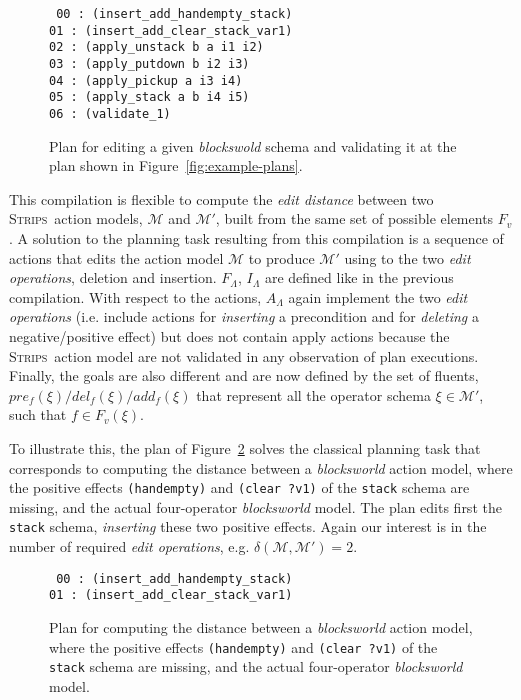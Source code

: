\documentclass[3p,times]{elsarticle}
\newcommand{\strips}{\textsc{Strips}}     %
\begin{document}
\begin{figure}[hbt!]
{\tt\small
00 : (insert\_add\_handempty\_stack)\\
01 : (insert\_add\_clear\_stack\_var1)\\
02 : (apply\_unstack b a i1 i2)\\
03 : (apply\_putdown b i2 i3)\\
04 : (apply\_pickup a i3 i4)\\
05 : (apply\_stack a b i4 i5)\\
06 : (validate\_1)
}
 \caption{\small Plan for editing a given {\em blockswold} schema and validating it at the plan shown in Figure~\ref{fig:example-plans}.}
\label{fig:plan-pdistance}
\end{figure}

This compilation is flexible to compute the {\em edit distance} between two \strips\ action models, $\mathcal{M}$ and $\mathcal{M}'$, built from the same set of possible elements $F_v$. A solution to the planning task resulting from this compilation is a sequence of actions that edits the action model $\mathcal{M}$ to produce $\mathcal{M}'$ using to the two {\em edit operations}, deletion and insertion. $F_{\Lambda}$, $I_{\Lambda}$ are defined like in the previous compilation. With respect to the actions, $A_{\Lambda}$ again implement the two {\em edit operations} (i.e. include actions for {\em inserting} a precondition and for {\em deleting} a negative/positive effect) but does not contain apply actions because the \strips\ action model are not validated in any observation of plan executions. Finally, the goals are also different and are now defined by the set of fluents, $pre_f(\xi)/del_f(\xi)/add_f(\xi)$ that represent all the operator schema $\xi\in\mathcal{M'}$, such that $f\in F_v(\xi)$.

To illustrate this, the plan of Figure~\ref{fig:plan-mdistance} solves the classical planning task that corresponds to computing the distance between a \emph{blocksworld} action model, where the positive effects {\tt\small (handempty)} and {\tt\small (clear ?v1)} of the {\tt\small stack} schema are missing, and the actual four-operator {\em blocksworld} model. The plan edits first the {\tt\small stack} schema, {\em inserting} these two positive effects. Again our interest is in the number of required {\em edit operations}, e.g. $\delta(\mathcal{M},\mathcal{M'})=2$. 

\begin{figure}[hbt!]
{\tt\small
00 : (insert\_add\_handempty\_stack)\\
01 : (insert\_add\_clear\_stack\_var1)
}
 \caption{\small Plan for computing the distance between a \emph{blocksworld} action model, where the positive effects {\tt\small (handempty)} and {\tt\small (clear ?v1)} of the {\tt\small stack} schema are missing, and the actual four-operator {\em blocksworld} model.}
\label{fig:plan-mdistance}
\end{figure}
\end{document}
